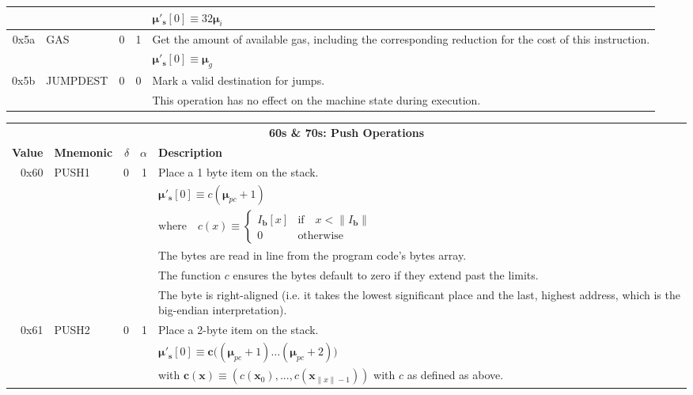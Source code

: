 \documentclass[9pt,oneside]{amsart}
\makeatletter
\newcommand*\ie{i.e.\@\xspace}
\makeatother
\begin{document}
\begin{tabularx}{\textwidth}{rlrrX}
&&&& $\boldsymbol{\mu}'_\mathbf{s}[0] \equiv 32\boldsymbol{\mu}_{i}$ \\
\midrule
0x5a & {\small GAS} & 0 & 1 & Get the amount of available gas, including the corresponding reduction for the cost of this instruction. \\
&&&& $\boldsymbol{\mu}'_\mathbf{s}[0] \equiv \boldsymbol{\mu}_{g}$ \\
\midrule
0x5b & {\small JUMPDEST} & 0 & 0 & Mark a valid destination for jumps. \\
&&&& This operation has no effect on the machine state during execution. \\
\bottomrule
\end{tabularx}

\begin{tabularx}{\textwidth}{rlrrX}
\toprule
\multicolumn{5}{c}{\textbf{60s \& 70s: Push Operations}} \vspace{5pt} \\
\textbf{Value} & \textbf{Mnemonic} & $\delta$ & $\alpha$ & \textbf{Description} \vspace{5pt} \\
0x60 & {\small PUSH1} & 0 & 1 & Place a 1 byte item on the stack. \\
&&&& $\boldsymbol{\mu}'_\mathbf{s}[0] \equiv c(\boldsymbol{\mu}_{pc} + 1)$ \\
&&&& $\text{where} \quad c(x) \equiv \begin{cases} I_\mathbf{b}[x] & \text{if} \quad x < \lVert I_\mathbf{b} \rVert \\ 0 & \text{otherwise} \end{cases}$ \\
&&&& The bytes are read in line from the program code's bytes array. \\
&&&& The function $c$ ensures the bytes default to zero if they extend past the limits.\\
&&&& The byte is right-aligned (\ie it takes the lowest significant place and the last, highest address, which is the big-endian interpretation). \\
\midrule
0x61 & {\small PUSH2} & 0 & 1 & Place a 2-byte item on the stack. \\
&&&& $\boldsymbol{\mu}'_\mathbf{s}[0] \equiv \boldsymbol{c}\big( (\boldsymbol{\mu}_{pc} + 1) \dots (\boldsymbol{\mu}_{pc} + 2) \big)$ \\
&&&& with $\boldsymbol{c}(\boldsymbol{x}) \equiv (c(\boldsymbol{x}_0), ..., c(\boldsymbol{x}_{\lVert x \rVert -1})) $ with $c$ as defined as above. \\

\end{tabularx}
\end{document}
